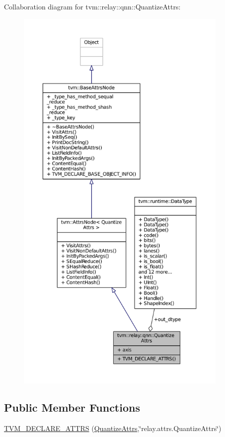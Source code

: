 Collaboration diagram for tvm\+:\+:relay\+:\+:qnn\+:\+:Quantize\+Attrs\+:
\nopagebreak
\begin{figure}[H]
\begin{center}
\leavevmode
\includegraphics[height=550pt]{structtvm_1_1relay_1_1qnn_1_1QuantizeAttrs__coll__graph}
\end{center}
\end{figure}
\subsection*{Public Member Functions}
\begin{DoxyCompactItemize}
\item 
\hyperlink{structtvm_1_1relay_1_1qnn_1_1QuantizeAttrs_a4a6266f19e38e4e770dfce4dc19873cd}{T\+V\+M\+\_\+\+D\+E\+C\+L\+A\+R\+E\+\_\+\+A\+T\+T\+RS} (\hyperlink{structtvm_1_1relay_1_1qnn_1_1QuantizeAttrs}{Quantize\+Attrs},\char`\"{}relay.\+attrs.\+Quantize\+Attrs\char`\"{})
\end{DoxyCompactItemize}
